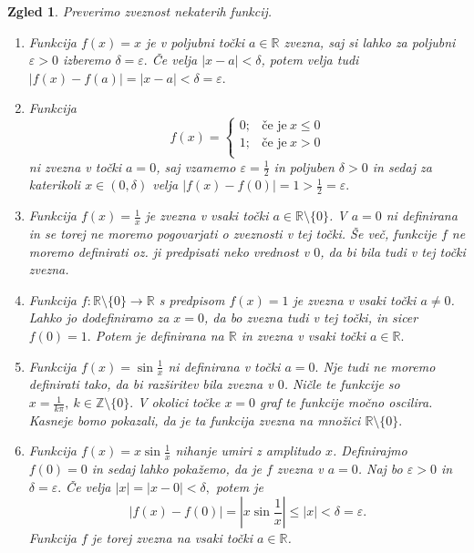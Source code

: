 \documentclass[10pt, a4paper]{article}
\newtheorem{zgled}[izr]{Zgled}
\newcommand{\Z}{\mathbb {Z}}
\newcommand{\R}{\mathbb {R}}
\begin{document}
\begin{zgled}
    Preverimo zveznost nekaterih funkcij.
    \begin{enumerate}
        \item Funkcija $f(x)=x$ je v poljubni točki $a \in \R$ zvezna,
        saj si lahko za poljubni $\varepsilon > 0$ izberemo $\delta = \varepsilon.$ Če velja $|x-a|<\delta$, potem velja tudi
        $|f(x) - f(a)| = |x-a| < \delta = \varepsilon.$
        \item Funkcija $$f(x) = \begin{cases}
            0; &\text{če je}\ x \leq 0\\
            1; &\text{če je}\ x > 0\\
        \end{cases}$$
        ni zvezna v točki $a = 0$, saj vzamemo $\varepsilon = \frac{1}{2}$ in poljuben $\delta>0$ in sedaj za katerikoli $x \in (0, \delta)$ velja 
        $|f(x) - f(0)| = 1 > \frac{1}{2} = \varepsilon.$
        \item Funkcija $f(x) = \frac{1}{x}$ je zvezna v vsaki točki $a \in \R \setminus \{0\}$. V $a = 0$ ni definirana in se torej ne moremo pogovarjati o zveznosti v tej točki. Še več, funkcije $f$ ne moremo definirati
        oz. ji predpisati neko vrednost v $0$, da bi bila tudi v tej točki zvezna.
        \item Funkcija
        $f : \R \setminus \{0\} \rightarrow \R$ s predpisom $f(x) = 1$
        je zvezna v vsaki točki $a \neq 0$. Lahko jo dodefiniramo za $x = 0$, da bo zvezna tudi v tej točki, in sicer
        $f(0) = 1.$ Potem je definirana na $\R$ in zvezna v vsaki točki $a \in \R.$
        \item Funkcija $f(x) = \sin{\frac{1}{x}}$ ni definirana v točki $a = 0.$ Nje tudi ne moremo definirati tako, da bi razširitev bila zvezna v $0$. Ničle te funkcije so 
        $x = \frac{1}{k\pi},\ k \in \Z \setminus \{0\}.$ V okolici točke $x = 0$ graf te funkcije močno oscilira. Kasneje bomo pokazali, da je ta funkcija zvezna na množici $\R \setminus \{0\}.$
        \item Funkcija $f(x) = x\sin{\frac{1}{x}}$ nihanje umiri z amplitudo $x$. Definirajmo $f(0) = 0$ in sedaj lahko pokažemo, da je $f$ zvezna v $a = 0$.
        Naj bo $\varepsilon>0$ in $\delta = \varepsilon.$ Če velja $|x| = |x-0|< \delta,$ potem je
        $$|f(x) - f(0)| = \left|x \sin{\frac{1}{x}} \right| \leq |x| < \delta = \varepsilon.$$ Funkcija $f$ je torej zvezna na vsaki točki $a \in \R$.
    \end{enumerate}
\end{zgled}
\end{document}
